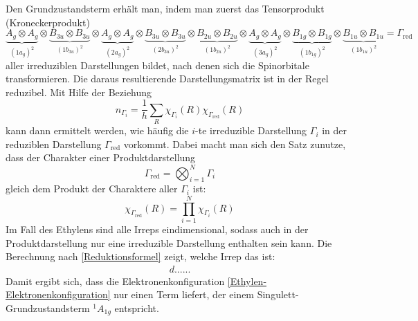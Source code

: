 \documentclass[9pt]{report}
\begin{document}
Den Grundzustandsterm erhält man, indem man zuerst das Tensorprodukt (Kroneckerprodukt)
\begin{equation}
\underbrace{A_{g}\otimes A_{g}}_{(1a_{g})^2}\otimes\underbrace{B_{3u}\otimes B_{3u}}_{(1b_{3u})^2}\otimes \underbrace{A_{g}\otimes A_{g}}_{(2a_{g})^2}\otimes\underbrace{B_{3u}\otimes B_{3u}}_{(2b_{3u})^2}\otimes \underbrace{B_{2u}\otimes B_{2u}}_{(1b_{2u})^2}\otimes \underbrace{A_{g}\otimes A_{g}}_{(3a_{g})^2}\otimes \underbrace{B_{1g}\otimes B_{1g}}_{(1b_{1g})^2}\otimes \underbrace{B_{1u}\otimes B_{1u}}_{(1b_{1u})^2}=\Gamma_{\mathrm{red}}
\end{equation}
aller irreduziblen Darstellungen bildet, nach denen sich die Spinorbitale transformieren. Die daraus resultierende Darstellungsmatrix ist in der Regel reduzibel. Mit Hilfe der Beziehung
\begin{equation}
n_{\Gamma_i}=\frac{1}{h}\sum_{R}\chi_{\Gamma_i}(R)\chi_{\Gamma_{\mathrm{red}}}(R)\label{Reduktionsformel}
\end{equation}
kann dann ermittelt werden, wie häufig die $i$-te irreduzible Darstellung $\Gamma_i$ in der reduziblen Darstellung $\Gamma_{\mathrm{red}}$ vorkommt. Dabei macht man sich den Satz zunutze, dass der Charakter einer Produktdarstellung
\begin{equation}
\Gamma_{\mathrm{red}}=\bigotimes_{i=1}^{N}\Gamma_i
\end{equation}
gleich dem Produkt der Charaktere aller $\Gamma_i$ ist:
\begin{equation}
\chi_{\Gamma_{\mathrm{red}}}(R)=\prod_{i=1}^{N}\chi_{\Gamma_i}(R)
\end{equation}
Im Fall des Ethylens sind alle Irreps eindimensional, sodass auch in der Produktdarstellung nur eine irreduzible Darstellung enthalten sein kann. Die Berechnung nach \eqref{Reduktionsformel} zeigt, welche Irrep das ist:
\begin{align}
d......
\end{align}
Damit ergibt sich, dass die Elektronenkonfiguration \eqref{Ethylen-Elektronenkonfiguration} nur einen Term liefert, der einem Singulett-Grundzustandsterm $^{1}A_{1g}$ entspricht.
\end{document}
